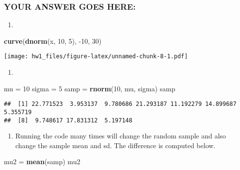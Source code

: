 \documentclass[
]{article}
\newenvironment{Shaded}{\begin{snugshade}}{\end{snugshade}}
\newcommand{\DecValTok}[1]{\textcolor[rgb]{0.00,0.00,0.81}{#1}}
\newcommand{\KeywordTok}[1]{\textcolor[rgb]{0.13,0.29,0.53}{\textbf{#1}}}
\newcommand{\NormalTok}[1]{#1}
\newcommand{\StringTok}[1]{\textcolor[rgb]{0.31,0.60,0.02}{#1}}
\providecommand{\tightlist}{%
  \setlength{\itemsep}{0pt}\setlength{\parskip}{0pt}}
\begin{document}
\hypertarget{your-answer-goes-here-1}{%
\subsubsection{YOUR ANSWER GOES HERE:}\label{your-answer-goes-here-1}}

\begin{enumerate}
\def\labelenumi{\arabic{enumi}.}
\tightlist
\item
\end{enumerate}

\begin{Shaded}
\begin{Highlighting}[]
\KeywordTok{curve}\NormalTok{(}\KeywordTok{dnorm}\NormalTok{(x, }\DecValTok{10}\NormalTok{, }\DecValTok{5}\NormalTok{), }\DecValTok{{-}10}\NormalTok{, }\DecValTok{30}\NormalTok{)}
\end{Highlighting}
\end{Shaded}

\texttt{[image: hw1\_files/figure-latex/unnamed-chunk-8-1.pdf]}

\begin{enumerate}
\def\labelenumi{\arabic{enumi}.}
\setcounter{enumi}{1}
\tightlist
\item
\end{enumerate}

\begin{Shaded}
\begin{Highlighting}[]
\NormalTok{mu =}\StringTok{ }\DecValTok{10}
\NormalTok{sigma =}\StringTok{ }\DecValTok{5}
\NormalTok{samp =}\StringTok{ }\KeywordTok{rnorm}\NormalTok{(}\DecValTok{10}\NormalTok{, mu, sigma)}
\NormalTok{samp}
\end{Highlighting}
\end{Shaded}

\begin{verbatim}
##  [1] 22.771523  3.953137  9.780686 21.293187 11.192279 14.899687  5.355719
##  [8]  9.748617 17.831312  5.197148
\end{verbatim}

\begin{enumerate}
\def\labelenumi{\arabic{enumi}.}
\setcounter{enumi}{2}
\tightlist
\item
  Running the code many times will change the random sample and also
  change the sample mean and sd. The difference is computed below.
\end{enumerate}

\begin{Shaded}
\begin{Highlighting}[]
\NormalTok{mu2 =}\StringTok{ }\KeywordTok{mean}\NormalTok{(samp)}
\NormalTok{mu2}
\end{Highlighting}
\end{Shaded}
\end{document}
